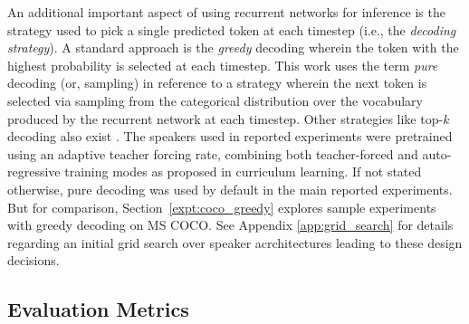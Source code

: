 An additional important aspect of using recurrent networks for inference is the strategy used to pick a single predicted token at each timestep (i.e., the \textit{decoding strategy}). A standard approach is the \textit{greedy} decoding wherein the token with the highest probability is selected at each timestep. %
This work uses the term \textit{pure} decoding (or, sampling) in reference to a strategy wherein the next token is selected via sampling from the categorical distribution over the vocabulary produced by the recurrent network at each timestep. Other strategies like top-$k$ decoding also exist \parencite{lazaridou2020multi}.  
The speakers used in reported experiments were pretrained using an adaptive teacher forcing rate, combining both teacher-forced and auto-regressive training modes as proposed in curriculum learning. If not stated otherwise, pure decoding was used by default in the main reported experiments. But for comparison, Section~\ref{expt:coco_greedy} explores sample experiments with greedy decoding on MS COCO. See Appendix \ref{app:grid_search} for details regarding an initial grid search over speaker acrchitectures leading to these design decisions.

\subsection{Evaluation Metrics}
\label{image_cap_metrics}

